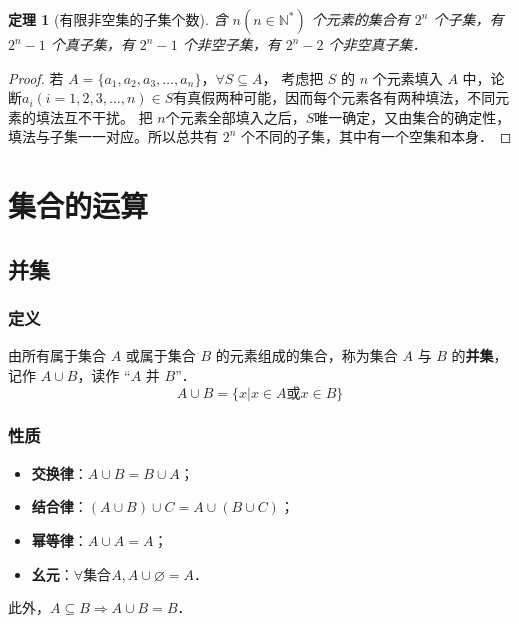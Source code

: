 \documentclass[a4paper,openany]{ctexbook}
\newtheorem{thmlevel1}{定理}
\begin{document}
\begin{thmlevel1}[有限非空集的子集个数]\label{thm:zijigeuu}
    含 \(n(n \in \mathbb{N^*})\) 个元素的集合有 \(2^n\) 个子集，有 \(2^n-1\) 个真子集，有 \(2^n-1\) 个非空子集，有 \(2^n-2\) 个非空真子集．
\end{thmlevel1}

\begin{proof}
    若 \(A=\{a_1,a_2,a_3,\dots,a_n\}\)，\(\forall S \subseteq A\)，
    考虑把 \(S\) 的 \(n\) 个元素填入 \(A\) 中，论断\(a_i(i=1,2,3,\dots,n)\in S\)有真假两种可能，因而每个元素各有两种填法，不同元素的填法互不干扰。
    把 \(n\)个元素全部填入之后，\(S\)唯一确定，又由集合的确定性，填法与子集一一对应。所以总共有 \(2^n\) 个不同的子集，其中有一个空集和本身．
\end{proof}

\section{集合的运算}

\subsection{并集}

\subsubsection{定义}

由所有属于集合 \(A\) 或属于集合 \(B\) 的元素组成的集合，称为集合 \(A\) 与 \(B\) 的\textbf{并集}，记作 \(A \cup B\)，读作 “\(A\) 并 \(B\)”．
\[
    A \cup B=\{x|x\in A \text{或} x\in B\}
\]

\subsubsection{性质}

\begin{itemize}
    \item \textbf{交换律}：\(A\cup B=B\cup A\)；
    \item \textbf{结合律}：\((A\cup B)\cup C=A\cup(B\cup C)\)；
    \item \textbf{幂等律}：\(A\cup A=A\)；
    \item \textbf{幺元}：\(\forall\text{集合}A, A\cup\varnothing=A\)．
\end{itemize}

此外，\(A\subseteq B \Rightarrow A\cup B=B\)．
\end{document}
